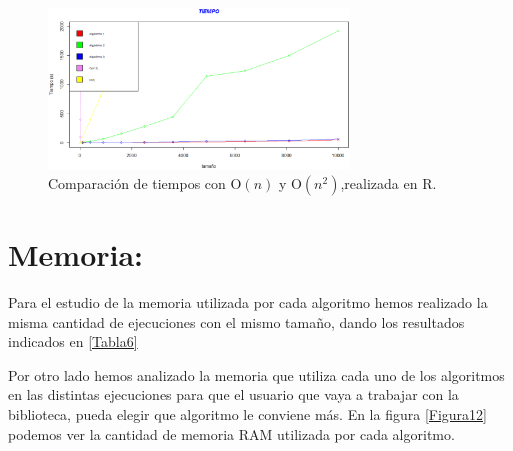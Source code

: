 \begin{figure}[h!]

	\centering
	\includegraphics[width=8cm]{./eps/tiempofinal.eps}
	\caption{Comparación de tiempos con O$(n)$ y O$(n^2)$,realizada en R.}
	\label{Figura11}

\end{figure}

\section{Memoria:}

Para el estudio de la memoria utilizada por cada algoritmo hemos realizado la misma cantidad de ejecuciones con el mismo tamaño, dando los resultados indicados en \ref{Tabla6}


\begin{table}[h!]
\begin{center}
\end{center}
\caption{Memoria RAM (Gb) utilizada en cada ejecución de los distintos algoritmos.} \label{Tabla6}
\end{table}


Por otro lado hemos analizado la memoria que utiliza cada uno de los algoritmos en las distintas ejecuciones para que el usuario que vaya a trabajar con la biblioteca, pueda elegir que algoritmo le conviene más. En la figura \ref{Figura12} podemos ver la cantidad de memoria RAM utilizada por cada algoritmo.

